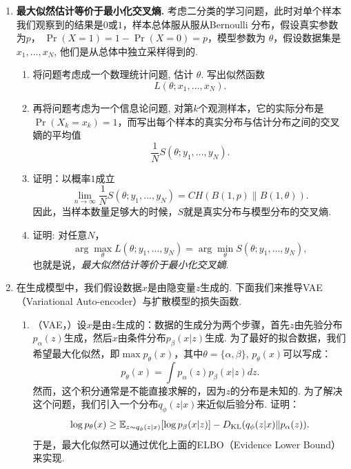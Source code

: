 \begin{enumerate}[wide, labelindent=0pt]
    \item \label{exercise:cross-entropy-maximum-likelihood} \textbf{最大似然估计等价于最小化交叉熵. }考虑二分类的学习问题，此时对单个样本我们观察到的结果是$0$或$1$，样本总体服从服从Bernoulli 分布，假设真实参数为$p$， $\Pr(X=1)=1-\Pr(X=0)=p$，模型参数为 $\theta$，假设数据集是 $x_1,\dots,x_N$, 他们是从总体中独立采样得到的.
    \begin{enumerate}
        \item 将问题考虑成一个数理统计问题, 估计 $\theta$. 写出似然函数 
        \[L(\theta ; x_1, \ldots, x_N).\]
        \item 再将问题考虑为一个信息论问题, 对第$k$个观测样本，它的实际分布是$\Pr(X_k=x_k)=1$，而写出每个样本的真实分布与估计分布之间的交叉嫡的平均值
        \[\frac{1}{N}S(\theta ; y_1, \ldots, y_N).\]
        \item 证明：以概率$1$成立
        \[\lim_{n\to\infty}\frac{1}{N}S(\theta ; y_1, \ldots, y_N)=CH(B(1,p)\| B(1,\theta)).\]
        因此，当样本数量足够大的时候，$S$就是真实分布与模型分布的交叉熵.
        \item 证明: 对任意$N$，
        \[\arg\max_\theta L(\theta ; y_1, \ldots, y_N)=\arg\min _\theta S(\theta ; y_1, \ldots, y_N),\]
        也就是说，\textit{最大似然估计等价于最小化交叉嫡}.
    \end{enumerate}

    \item \label{exercise:diffusion-model-loss}
    在生成模型中，我们假设数据$x$是由隐变量$z$生成的. 下面我们来推导VAE（Variational Auto-encoder）与扩散模型的损失函数.
    \begin{enumerate}
        \item （VAE，\cite{kingmaAutoEncodingVariationalBayes2022,kingmaSemisupervisedLearningDeep2014}）设$x$是由$z$生成的：数据的生成分为两个步骤，首先$z$由先验分布$p_{\alpha}(z)$生成，然后$x$由条件分布$p_{\beta}(x|z)$生成. 为了最好的拟合数据，我们希望最大化似然，即$\max p_{\theta}(x)$，其中$\theta = \{\alpha, \beta\}$, $p_{\theta}(x)$可以写成：
        \[
            p_{\theta}(x) = \int p_{\alpha}(z)p_{\beta}(x|z)dz.
        \]
        然而，这个积分通常是不能直接求解的，因为$z$的分布是未知的. 为了解决这个问题，我们引入一个分布$q_{\phi}(z|x)$来近似后验分布. 证明：
        \[
            \log p_{\theta}(x) \geq \mathbb{E}_{z\sim q_{\phi}(z|x)}[\log p_{\beta}(x|z)] - D_{\mathrm{KL}}(q_{\phi}(z|x)\Vert p_{\alpha}(z)).
        \]
        于是，最大化似然可以通过优化上面的ELBO（Evidence Lower Bound）来实现.


\end{enumerate}
\end{enumerate}

